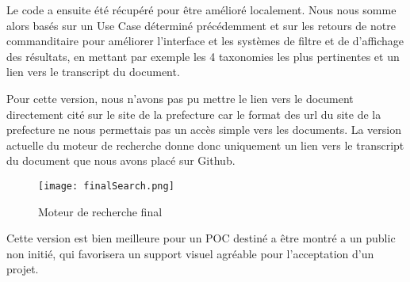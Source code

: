 Le code a ensuite été récupéré pour être amélioré localement.
Nous nous somme alors basés sur un Use Case déterminé précédemment et sur les retours de notre commanditaire pour améliorer l'interface et les systèmes de filtre et de d'affichage des résultats, en mettant par exemple les 4 taxonomies les plus pertinentes et un lien vers le transcript du document.

Pour cette version, nous n'avons pas pu mettre le lien vers le document directement cité sur le site de la prefecture car le format des url du site de la prefecture ne nous permettais pas un accès simple vers les documents.
La version actuelle du moteur de recherche donne donc uniquement un lien vers le transcript du document que nous avons placé sur Github.


\begin{figure}[h!]
  \centering
  \texttt{[image: finalSearch.png]}
	\caption[]{Moteur de recherche final}
	\label{fig:finalSearch}
\end{figure}

Cette version est bien meilleure pour un POC destiné a être montré a un public non initié, qui favorisera un support visuel agréable pour l'acceptation d'un projet.










